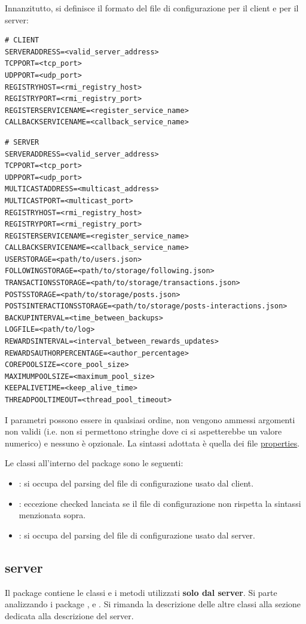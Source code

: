 \documentclass[11pt, italian, openany]{book}
\begin{document}
\begin{sloppypar}
Innanzitutto, si definisce il formato del file di configurazione per il client e per il server:
\begin{lstlisting}[style=code]
# CLIENT
SERVERADDRESS=<valid_server_address>
TCPPORT=<tcp_port>
UDPPORT=<udp_port>
REGISTRYHOST=<rmi_registry_host>
REGISTRYPORT=<rmi_registry_port>
REGISTERSERVICENAME=<register_service_name>
CALLBACKSERVICENAME=<callback_service_name>
\end{lstlisting}
\pagebreak
\begin{lstlisting}[style=code]
# SERVER
SERVERADDRESS=<valid_server_address>
TCPPORT=<tcp_port>
UDPPORT=<udp_port>
MULTICASTADDRESS=<multicast_address>
MULTICASTPORT=<multicast_port>
REGISTRYHOST=<rmi_registry_host>
REGISTRYPORT=<rmi_registry_port>
REGISTERSERVICENAME=<register_service_name>
CALLBACKSERVICENAME=<callback_service_name>
USERSTORAGE=<path/to/users.json>
FOLLOWINGSTORAGE=<path/to/storage/following.json>
TRANSACTIONSSTORAGE=<path/to/storage/transactions.json>
POSTSSTORAGE=<path/to/storage/posts.json>
POSTSINTERACTIONSSTORAGE=<path/to/storage/posts-interactions.json>
BACKUPINTERVAL=<time_between_backups>
LOGFILE=<path/to/log>
REWARDSINTERVAL=<interval_between_rewards_updates>
REWARDSAUTHORPERCENTAGE=<author_percentage>
COREPOOLSIZE=<core_pool_size>
MAXIMUMPOOLSIZE=<maximum_pool_size>
KEEPALIVETIME=<keep_alive_time>
THREADPOOLTIMEOUT=<thread_pool_timeout>
\end{lstlisting}
I parametri possono essere in qualsiasi ordine, non vengono ammessi argomenti non validi (i.e. non si permettono
stringhe dove ci si aspetterebbe un valore numerico) e nessuno \`e opzionale. La sintassi adottata \`e quella dei file
\href{https://en.wikipedia.org/wiki/.properties}{properties}.

Le classi all'interno del package sono le seguenti:
\begin{itemize}[itemsep=0pt, parsep=0pt, topsep=0pt]
	\item {}: si occupa del parsing del file di configurazione usato dal client.
	\item {}: eccezione checked lanciata se il file di configurazione non rispetta la sintassi menzionata sopra.
	\item {}: si occupa del parsing del file di configurazione usato dal server.
\end{itemize}

\subsection*{server}
Il package contiene le classi e i metodi utilizzati \textbf{solo dal server}.
Si parte analizzando i package ,  e . Si rimanda la descrizione delle altre classi alla sezione
dedicata alla descrizione del server.


\end{sloppypar}
\end{document}
